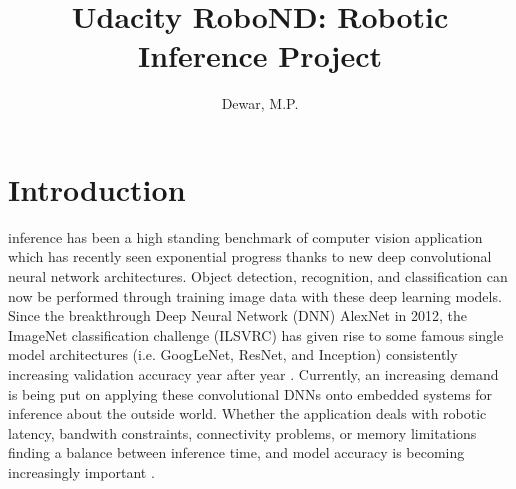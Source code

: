 \documentclass[10pt,journal,compsoc]{IEEEtran}
\begin{document}
\title{Udacity RoboND: Robotic Inference Project}

\author{Dewar, M.P.}

%
{}


\maketitle
\IEEEdisplaynontitleabstractindextext
\IEEEpeerreviewmaketitle

\section{Introduction}
\label{sec:introduction}

 inference has been a high standing benchmark of computer vision application which has recently seen exponential progress thanks to new deep convolutional neural network architectures. Object detection, recognition, and classification can now be performed through training image data with these deep learning models. Since the breakthrough Deep Neural Network (DNN) AlexNet in 2012, the ImageNet classification challenge (ILSVRC) has given rise to some famous single model architectures (i.e. GoogLeNet, ResNet, and Inception) consistently increasing validation accuracy year after year \cite{DBLP:journals/corr/CanzianiPC16}. Currently, an increasing demand is being put on applying these convolutional DNNs onto embedded systems for inference about the outside world. Whether the application deals with robotic latency, bandwith constraints, connectivity problems, or memory limitations finding a balance between inference time, and model accuracy is becoming increasingly important \cite{UdacityLesson7}.
\end{document}
